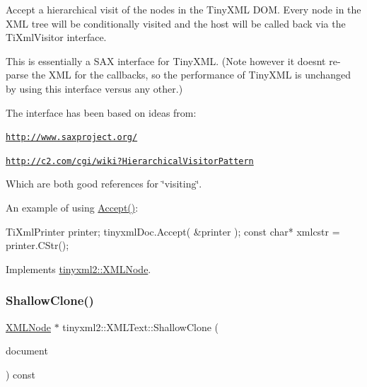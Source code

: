 Accept a hierarchical visit of the nodes in the Tiny\+X\+ML D\+OM. Every node in the X\+ML tree will be conditionally visited and the host will be called back via the Ti\+Xml\+Visitor interface.

This is essentially a S\+AX interface for Tiny\+X\+ML. (Note however it doesn\textquotesingle{}t re-\/parse the X\+ML for the callbacks, so the performance of Tiny\+X\+ML is unchanged by using this interface versus any other.)

The interface has been based on ideas from\+:


\begin{DoxyItemize}
\item \href{http://www.saxproject.org/}{\tt http\+://www.\+saxproject.\+org/}
\item \href{http://c2.com/cgi/wiki?HierarchicalVisitorPattern}{\tt http\+://c2.\+com/cgi/wiki?\+Hierarchical\+Visitor\+Pattern}
\end{DoxyItemize}

Which are both good references for \char`\"{}visiting\char`\"{}.

An example of using \hyperlink{classtinyxml2_1_1XMLText_a537c60d7e18fb59c45ac2737a29ac47a}{Accept()}\+: \begin{DoxyVerb}TiXmlPrinter printer;
tinyxmlDoc.Accept( &printer );
const char* xmlcstr = printer.CStr();
\end{DoxyVerb}
 

Implements \hyperlink{classtinyxml2_1_1XMLNode_a81e66df0a44c67a7af17f3b77a152785}{tinyxml2\+::\+X\+M\+L\+Node}.

\mbox{\label{classtinyxml2_1_1XMLText_a86d265c93152726c8c6831e9594840e6}} 
\subsubsection{\texorpdfstring{Shallow\+Clone()}{ShallowClone()}\hspace{0.1cm}{\footnotesize\ttfamily [1/2]}}
{\footnotesize\ttfamily \hyperlink{classtinyxml2_1_1XMLNode}{X\+M\+L\+Node} $\ast$ tinyxml2\+::\+X\+M\+L\+Text\+::\+Shallow\+Clone (\begin{DoxyParamCaption}\item[{\hyperlink{classtinyxml2_1_1XMLDocument}{X\+M\+L\+Document} $\ast$}]{document }\end{DoxyParamCaption}) const\hspace{0.3cm}{\ttfamily [virtual]}}

